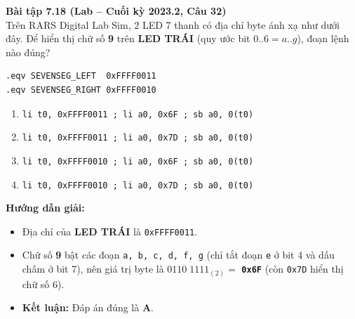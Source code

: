 \textbf{Bài tập 7.18 (Lab -- Cuối kỳ 2023.2, Câu 32)}\\
Trên RARS Digital Lab Sim, 2 LED 7 thanh có địa chỉ byte ánh xạ như dưới đây. Để hiển thị chữ số \textbf{9} trên \textbf{LED TRÁI} (quy ước bit $0..6 = a..g$), đoạn lệnh nào đúng?
\begin{lstlisting}
.eqv SEVENSEG_LEFT  0xFFFF0011
.eqv SEVENSEG_RIGHT 0xFFFF0010
\end{lstlisting}
\begin{enumerate}[label=\Alph*.]
    \item \texttt{li t0, 0xFFFF0011 ; li a0, 0x6F ; sb a0, 0(t0)}
    \item \texttt{li t0, 0xFFFF0011 ; li a0, 0x7D ; sb a0, 0(t0)}
    \item \texttt{li t0, 0xFFFF0010 ; li a0, 0x6F ; sb a0, 0(t0)}
    \item \texttt{li t0, 0xFFFF0010 ; li a0, 0x7D ; sb a0, 0(t0)}
\end{enumerate}
\textbf{Hướng dẫn giải:}
\begin{itemize}
    \item Địa chỉ của \textbf{LED TRÁI} là \texttt{0xFFFF0011}.
    \item Chữ số \textbf{9} bật các đoạn \texttt{a, b, c, d, f, g} (chỉ tắt đoạn \texttt{e} ở bit 4 và dấu chấm ở bit 7), nên giá trị byte là $0110\;1111_{(2)} =$ \textbf{\texttt{0x6F}} (còn \texttt{0x7D} hiển thị chữ số 6).
    \item \textbf{Kết luận:} Đáp án đúng là \textbf{A}.
\end{itemize}

